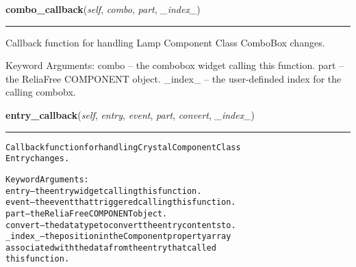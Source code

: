     \label{reliafree:miscellaneous:filter:Filter:combo_callback}

    \vspace{0.5ex}

\hspace{.8\funcindent}\begin{boxedminipage}{\funcwidth}

    \raggedright \textbf{combo\_callback}(\textit{self}, \textit{combo}, \textit{part}, \textit{\_index\_})

    \vspace{-1.5ex}

    \rule{\textwidth}{0.5\fboxrule}
\setlength{\parskip}{2ex}
    Callback function for handling Lamp Component Class ComboBox changes.

    Keyword Arguments: combo   -- the combobox widget calling this 
    function. part    -- the ReliaFree COMPONENT object. \_index\_ -- the 
    user-definded index for the calling combobx.

\setlength{\parskip}{1ex}
    \end{boxedminipage}

    \label{reliafree:miscellaneous:filter:Filter:entry_callback}

    \vspace{0.5ex}

\hspace{.8\funcindent}\begin{boxedminipage}{\funcwidth}

    \raggedright \textbf{entry\_callback}(\textit{self}, \textit{entry}, \textit{event}, \textit{part}, \textit{convert}, \textit{\_index\_})

    \vspace{-1.5ex}

    \rule{\textwidth}{0.5\fboxrule}
\setlength{\parskip}{2ex}
\begin{alltt}
Callback function for handling Crystal Component Class
Entry changes.

Keyword Arguments:
entry   -- the entry widget calling this function.
event   -- the event that triggered calling this function.
part    -- the ReliaFree COMPONENT object.
convert -- the data type to convert the entry contents to.
\_index\_ -- the position in the Component property array
           associated with the data from the entry that called
           this function.
\end{alltt}

\setlength{\parskip}{1ex}
    \end{boxedminipage}

